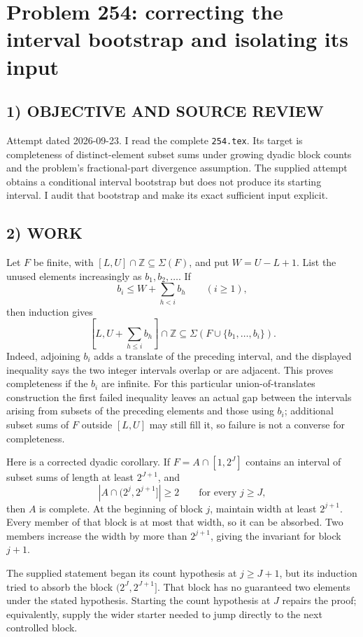 \section{Problem 254: correcting the interval bootstrap and isolating its input}
\subsection*{1) OBJECTIVE AND SOURCE REVIEW}
Attempt dated 2026-09-23. I read the complete \texttt{254.tex}. Its target is completeness of distinct-element subset sums under growing dyadic block counts and the problem's fractional-part divergence assumption. The supplied attempt obtains a conditional interval bootstrap but does not produce its starting interval. I audit that bootstrap and make its exact sufficient input explicit.
\subsection*{2) WORK}
Let $F$ be finite, with $[L,U]\cap\mathbb Z\subseteq\Sigma(F)$, and put $W=U-L+1$. List the unused elements increasingly as $b_1,b_2,\ldots$. If
\[
b_i\le W+\sum_{h<i}b_h\qquad(i\ge1),
\]
then induction gives
\[
\left[L,U+\sum_{h\le i}b_h\right]\cap\mathbb Z
\subseteq\Sigma(F\cup\{b_1,\ldots,b_i\}).
\]
Indeed, adjoining $b_i$ adds a translate of the preceding interval, and the displayed inequality says the two integer intervals overlap or are adjacent. This proves completeness if the $b_i$ are infinite. For this particular union-of-translates construction the first failed inequality leaves an actual gap between the intervals arising from subsets of the preceding elements and those using $b_i$; additional subset sums of $F$ outside $[L,U]$ may still fill it, so failure is not a converse for completeness.

Here is a corrected dyadic corollary. If $F=A\cap[1,2^J]$ contains an interval of subset sums of length at least $2^{J+1}$, and
\[
|A\cap(2^j,2^{j+1}]|\ge2\qquad\text{for every }j\ge J,
\]
then $A$ is complete. At the beginning of block $j$, maintain width at least $2^{j+1}$. Every member of that block is at most that width, so it can be absorbed. Two members increase the width by more than $2^{j+1}$, giving the invariant for block $j+1$.

The supplied statement began its count hypothesis at $j\ge J+1$, but its induction tried to absorb the block $(2^J,2^{J+1}]$. That block has no guaranteed two elements under the stated hypothesis. Starting the count hypothesis at $J$ repairs the proof; equivalently, supply the wider starter needed to jump directly to the next controlled block.
